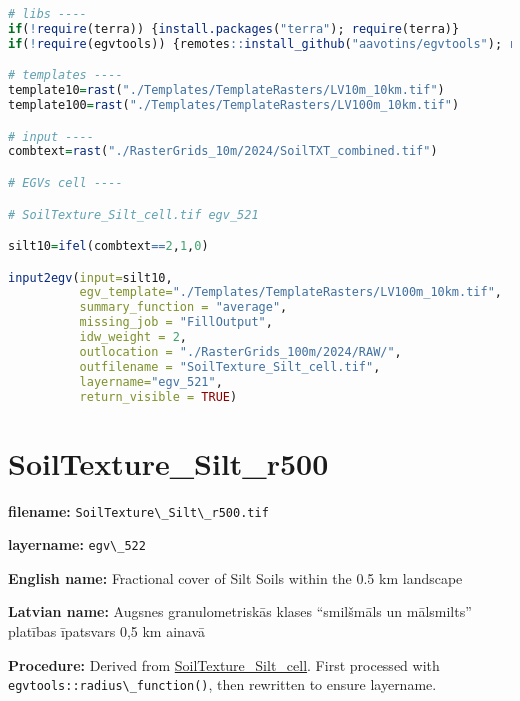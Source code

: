 \documentclass[
]{book}
\newcommand{\passthrough}[1]{#1}
\begin{document}
\begin{lstlisting}[language=R]
# libs ----
if(!require(terra)) {install.packages("terra"); require(terra)}
if(!require(egvtools)) {remotes::install_github("aavotins/egvtools"); require(egvtools)}

# templates ----
template10=rast("./Templates/TemplateRasters/LV10m_10km.tif")
template100=rast("./Templates/TemplateRasters/LV100m_10km.tif")

# input ----
combtext=rast("./RasterGrids_10m/2024/SoilTXT_combined.tif")

# EGVs cell ----

# SoilTexture_Silt_cell.tif egv_521

silt10=ifel(combtext==2,1,0)

input2egv(input=silt10,
          egv_template="./Templates/TemplateRasters/LV100m_10km.tif",
          summary_function = "average",
          missing_job = "FillOutput",
          idw_weight = 2,
          outlocation = "./RasterGrids_100m/2024/RAW/",
          outfilename = "SoilTexture_Silt_cell.tif",
          layername="egv_521",
          return_visible = TRUE)
\end{lstlisting}

\section{SoilTexture\_Silt\_r500}\label{ch06.522}

\textbf{filename:} \passthrough{\lstinline!SoilTexture\_Silt\_r500.tif!}

\textbf{layername:} \passthrough{\lstinline!egv\_522!}

\textbf{English name:} Fractional cover of Silt Soils within the 0.5 km landscape

\textbf{Latvian name:} Augsnes granulometriskās klases ``smilšmāls un mālsmilts'' platības īpatsvars 0,5 km ainavā

\textbf{Procedure:} Derived from \hyperref[ch06.521]{SoilTexture\_Silt\_cell}. First processed
with \passthrough{\lstinline!egvtools::radius\_function()!}, then rewritten to ensure layername.
\end{document}
